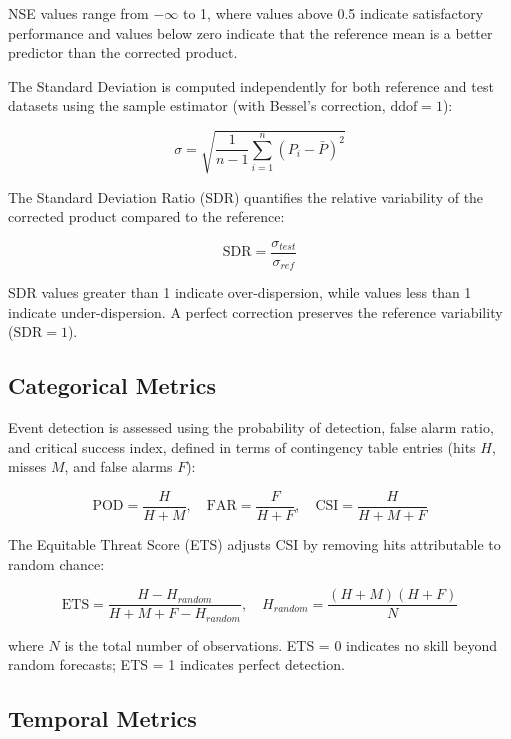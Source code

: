 \documentclass[11pt,a4paper]{article}
\begin{document}
NSE values range from $-\infty$ to 1, where values above 0.5 indicate satisfactory performance and values below zero indicate that the reference mean is a better predictor than the corrected product.

The Standard Deviation is computed independently for both reference and test datasets using the sample estimator (with Bessel's correction, $\text{ddof} = 1$):

\begin{equation}\sigma = \sqrt{\frac{1}{n-1} \sum_{i=1}^{n} (P_i - \bar{P})^2}\end{equation}

The Standard Deviation Ratio (SDR) quantifies the relative variability of the corrected product compared to the reference:

\begin{equation}\text{SDR} = \frac{\sigma_{test}}{\sigma_{ref}}\end{equation}

SDR values greater than 1 indicate over-dispersion, while values less than 1 indicate under-dispersion. A perfect correction preserves the reference variability ($\text{SDR} = 1$).

\subsection{Categorical Metrics}

Event detection is assessed using the probability of detection, false alarm ratio, and critical success index, defined in terms of contingency table entries (hits $H$, misses $M$, and false alarms $F$):

\begin{equation}\text{POD} = \frac{H}{H + M}, \quad \text{FAR} = \frac{F}{H + F}, \quad \text{CSI} = \frac{H}{H + M + F}\end{equation}

The Equitable Threat Score (ETS) adjusts CSI by removing hits attributable to random chance:

\begin{equation}\text{ETS} = \frac{H - H_{random}}{H + M + F - H_{random}}, \quad H_{random} = \frac{(H + M)(H + F)}{N}\end{equation}

where $N$ is the total number of observations. ETS = 0 indicates no skill beyond random forecasts; ETS = 1 indicates perfect detection.

\subsection{Temporal Metrics}
\end{document}

